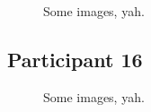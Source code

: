\clearpage

\begin{figure}[h]
	\caption{Some images, yah.}
\end{figure}

\lipsum[1]


\clearpage

\subsection{Participant 16}

\begin{figure}[h]
	\caption{Some images, yah.}
\end{figure}

\lipsum[1]

\clearpage

